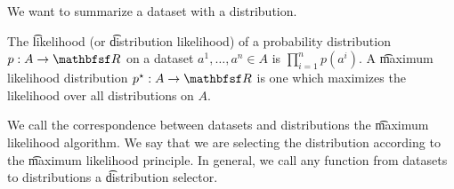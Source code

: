 
We want to summarize a dataset with a distribution.


The \t{likelihood} (or \t{distribution likelihood}) of a probability distribution $p: A \to \R $ on a dataset $a^1, \dots, a^n \in A$ is $\prod_{i = 1}^{n} p(a^i)$.
A \t{maximum likelihood distribution} $p^\star: A \to \R $ is one which maximizes the likelihood over all distributions on $A$.

We call the correspondence between datasets and distributions the \t{maximum likelihood algorithm}.
We say that we are selecting the distribution according to the \t{maximum likelihood principle}.
In general, we call any function from datasets to distributions a \t{distribution selector}.

\blankpage

